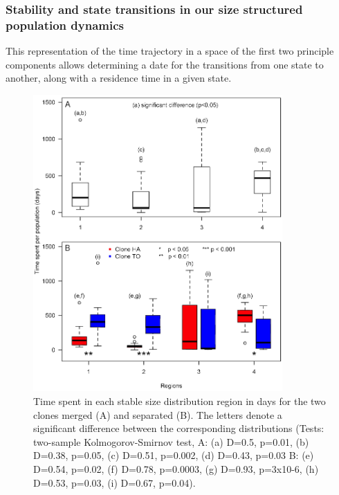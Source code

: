 \subsubsection{Stability and state transitions in our size structured
population dynamics}

This representation of the time trajectory in a space of the first two principle
components allows determining a date for the transitions from one state to
another, along with a residence time in a given state.

\begin{figure}[!ht]
\begin{center}
\includegraphics[width=0.85\textwidth]{3-1_ChapExp1/Fig/AnnSP7}
\caption[Time spent in each stable size
distribution region]{Time spent in each stable size distribution region in days
for the two clones merged (A) and separated (B). The letters denote a
significant difference between the corresponding distributions (Tests:
two-sample Kolmogorov-Smirnov test, A: (a) D=0.5, p=0.01, (b) D=0.38, p=0.05,
(c) D=0.51, p=0.002, (d) D=0.43, p=0.03 B: (e) D=0.54, p=0.02, (f) D=0.78,
p=0.0003, (g) D=0.93, p=3x10-6, (h) D=0.53, p=0.03, (i) D=0.67, p=0.04).}
\label{fig:AnSP7}
\end{center}
\end{figure}

